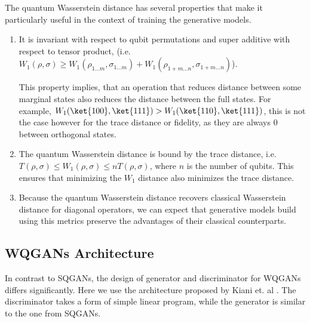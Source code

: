 The quantum Wasserstein distance has several properties that make it
particularly useful in the context of training the generative models.
\begin{enumerate}
\item It is invariant with respect to qubit permutations and super additive with
  respect to tensor product, (i.e. $W_1(\rho, \sigma) \geq W_1(\rho_{1 \ldots m},
  \sigma_{1 \ldots m}) + W_1(\rho_{1+m \ldots n},
  \sigma_{1+m \ldots n})$). 

  This property implies, that an operation that reduces distance between some
  marginal states also reduces the distance between the full states. For example,
  $W_1(\ket{100}, \ket{111}) > W_1(\ket{110}, \ket{111})$, this is not the case
  however for the trace distance or fidelity, as they are always $0$
  between orthogonal states. 
\item The quantum Wasserstein distance is bound by the trace distance, i.e.
  $T(\rho, \sigma) \leq W_1(\rho, \sigma) \leq nT(\rho, \sigma)$, where $n$ is
  the number of qubits. This ensures that minimizing the $W_1$ distance also
  minimizes the trace distance.
\item Because the quantum Wasserstein distance recovers classical Wasserstein
  distance for diagonal operators, we can expect that generative models build
  using this metrics preserve the advantages of their classical counterparts.
\end{enumerate}

\subsection{WQGANs Architecture}
In contrast to SQGANs, the design of generator and discriminator for WQGANs
differs significantly. Here we use the architecture proposed by Kiani et. al
\cite{kiani2021quantum}. The discriminator takes a form of simple linear
program, while the generator is similar to the one from SQGANs.

